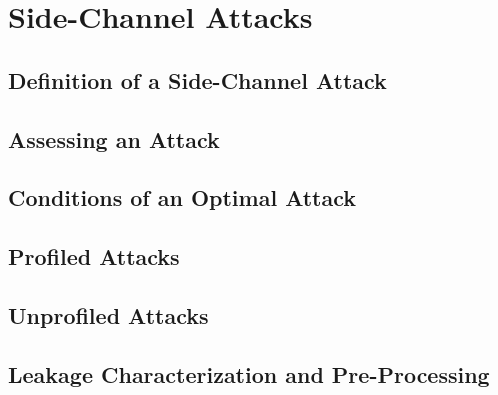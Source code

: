 \chapter{Side-Channel Attacks}
\label{chap:sca}
\minitoc
\newpage
\section{Definition of a Side-Channel Attack}
    \label{sec:attack_scenario}
    

\section{Assessing an Attack}  %
    \label{sec:assessing_success}
    

\section{Conditions of an Optimal Attack}  %
    \label{sec:thm_heuser}
    

\section{Profiled Attacks}
    \label{sec:profiled_attacks}
    

\section{Unprofiled Attacks}
    \label{sec:non_profiled_attacks}
    

\section{Leakage Characterization and Pre-Processing}
\label{sec:characterization}


